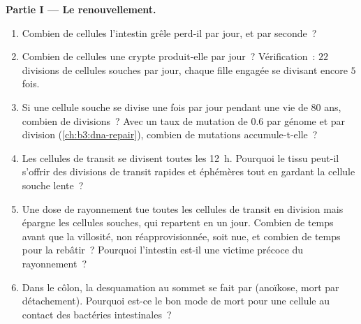 \begin{problem}
\medskip
\noindent\textbf{Partie I --- Le renouvellement.}
\begin{enumerate}
  \item Combien de cellules l'intestin grêle perd-il par jour, et par
        seconde~?
  \item Combien de cellules une crypte produit-elle par jour~?
        Vérification~: $22$ divisions de cellules souches par jour,
        chaque fille engagée se divisant encore $5$ fois.
  \item Si une cellule souche se divise une fois par jour pendant une
        vie de $80$ ans, combien de divisions~? Avec un taux de
        mutation de $0.6$ par génome et par division
        (\cref{ch:b3:dna-repair}), combien de mutations
        accumule-t-elle~?
  \item Les cellules de transit se divisent toutes les \qty{12}{h}.
        Pourquoi le tissu peut-il s'offrir des divisions de transit
        rapides et éphémères tout en gardant la cellule souche lente~?
  \item Une dose de rayonnement tue toutes les cellules de transit en
        division mais épargne les cellules souches, qui repartent en
        un jour. Combien de temps avant que la villosité, non
        réapprovisionnée, soit nue, et combien de temps pour la
        rebâtir~? Pourquoi l'intestin est-il une victime précoce du
        rayonnement~?
  \item Dans le côlon, la desquamation au sommet se fait par 
        (anoïkose, mort par détachement). Pourquoi est-ce le bon mode
        de mort pour une cellule au contact des bactéries
        intestinales~?
\end{enumerate}


\end{problem}
